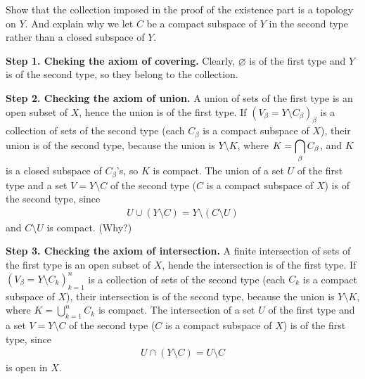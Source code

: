 \begin{prob}\label{check 1p cptf topology}
    Show that the collection imposed in the proof of the existence part is a topology on $Y$.
    And explain why we let $C$ be a compact subspace of $Y$ in the second type rather than a closed subspace of $Y$.
\end{prob}
\begin{sol}
    \textbf{Step 1. Cheking the axiom of covering.}\newline\noindent
    Clearly, $\varnothing$ is of the first type and $Y$ is of the second type, so they belong to the collection.

    \textbf{Step 2. Checking the axiom of union.}\newline\noindent
    A union of sets of the first type is an open subset of $X$, hence the union is of the first type.
    If $(V_\beta=Y\setminus C_\beta)_\beta$ is a collection of sets of the second type (each $C_\beta$ is a compact subspace of $X$), their union is of the second type, because the union is $Y\setminus K$, where $\displaystyle{K=\bigcap_\beta C_\beta}$, and $K$ is a closed subspace of $C_\beta$'s, so $K$ is compact.
    The union of a set $U$ of the first type and a set $V=Y\setminus C$ of the second type ($C$ is a compact subspace of $X$) is of the second type, since
    \begin{align*}
        U\cup (Y\setminus C)=Y\setminus (C\setminus U)
    \end{align*}
    and $C\setminus U$ is compact. \color{brown}(Why?)\color{black}

    \textbf{Step 3. Checking the axiom of intersection.}\newline\noindent
    A finite intersection of sets of the first type is an open subset of $X$, hende the intersection is of the first type.
    If $(V_\beta=Y\setminus C_k)_{k=1}^n$ is a collection of sets of the second type (each $C_k$ is a compact subspace of $X$), their intersection is of the second type, because the union is $Y\setminus K$, where $K=\bigcup_{k=1}^n C_k$ is compact.
    The intersection of a set $U$ of the first type and a set $V=Y\setminus C$ of the second type ($C$ is a compact subspace of $X$) is of the first type, since
    \begin{align*}
        U\cap (Y\setminus C)=U\setminus C
    \end{align*}
    is open in $X$.
\end{sol}

